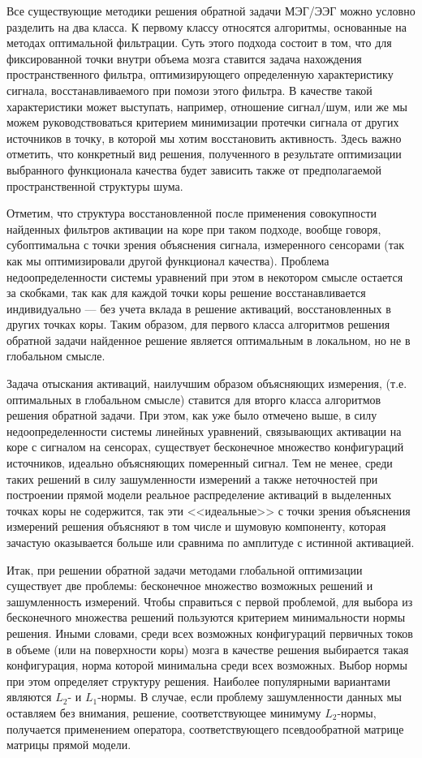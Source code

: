 Все существующие методики решения обратной задачи МЭГ/ЭЭГ можно условно разделить на два класса.
К первому классу относятся алгоритмы, основанные на методах оптимальной фильтрации.
Суть этого подхода состоит в том, что для фиксированной точки внутри объема мозга ставится задача нахождения
пространственного фильтра, оптимизирующего определенную характеристику сигнала,
восстанавливаемого при помози этого фильтра.
В качестве такой характеристики может выступать, например, отношение сигнал/шум,
или же мы можем руководствоваться критерием минимизации протечки сигнала от других источников в точку,
в которой мы хотим восстановить активность.
Здесь важно отметить, что конкретный вид решения, полученного в результате оптимизации выбранного
функционала качества будет зависить также от предполагаемой пространственной структуры шума.

Отметим, что структура восстановленной после применения совокупности найденных фильтров
активации на коре при таком подходе, вообще говоря, субоптимальна с точки зрения объяснения сигнала,
измеренного сенсорами (так как мы оптимизировали другой функционал качества).
Проблема недоопределенности системы уравнений при этом в некотором смысле остается за скобками,
так как для каждой точки коры решение восстанавливается индивидуально ---
без учета вклада в решение активаций, восстановленных в других точках коры.
Таким образом, для первого класса алгоритмов решения обратной задачи найденное решение
является оптимальным в локальном, но не в глобальном смысле.

Задача отыскания активаций, наилучшим образом объясняющих измерения, (т.е. оптимальных в глобальном смысле)
ставится для вторго класса алгоритмов решения обратной задачи.
При этом, как уже было отмечено выше, в силу недоопределенности системы линейных уравнений,
связывающих активации на коре с сигналом на сенсорах, существует бесконечное множество
конфигураций источников, идеально объясняющих померенный сигнал.
Тем не менее, среди таких решений в силу зашумленности измерений а также неточностей
при построении прямой модели реальное распределение активаций в выделенных точках коры
не содержится, так эти <<идеальные>> с точки зрения объяснения измерений решения объясняют в том числе и
шумовую компоненту, которая зачастую оказывается больше или сравнима по амплитуде с истинной активацией.

Итак, при решении обратной задачи методами глобальной оптимизации существует две проблемы:
бесконечное множество возможных решений и зашумленность измерений. Чтобы справиться с первой проблемой,
для выбора из бесконечного множества решений пользуются критерием минимальности нормы решения.
Иными словами, среди всех возможных конфигураций первичных токов в объеме (или на поверхности коры) мозга
в качестве решения выбирается такая конфигурация, норма которой минимальна среди всех возможных.
Выбор нормы при этом определяет структуру решения.
Наиболее популярными вариантами являются $L_2$- и $L_1$-нормы.
В случае, если проблему зашумленности данных мы оставляем без внимания, решение, соответствующее
минимуму $L_2$-нормы, получается применением оператора,
соответствующего псевдообратной матрице матрицы прямой модели.




